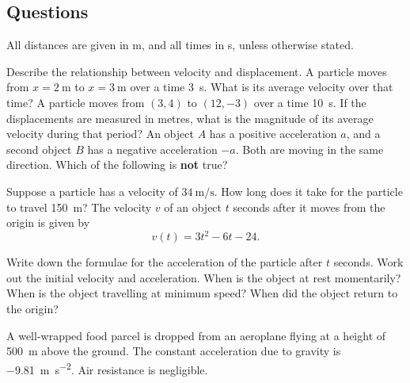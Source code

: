 \subsection*{Questions}
All distances are given in \si{\metre}, and all times in \si{\second}, unless otherwise stated.
\begin{questions}
  \questioA Describe the relationship between velocity and displacement.
  \questioA A particle moves from $ x = \SI{2}{\metre} $ to $ x = \SI{3}{\metre} $ over a time \SI{3}{\second}. What is its average velocity over that time?
  \questioA A particle moves from $ (3,4) $ to $ (12,-3) $ over a time \SI{10}{\second}. If the displacements are measured in metres, what is the magnitude of
            its average velocity during that period?
  \questioA An object $ A $ has a positive acceleration $ a $, and a second object $ B $ has a negative acceleration $ -a $. Both are moving in the
            same direction. Which of the following is \textbf{not} true?
  \questioA Suppose a particle has a velocity of $ \SI{34}{\metre\per\second} $. How long does it take for the particle to travel \SI{150}{\metre}?
  \question The velocity $ v $ of an object $ t $ seconds after it moves from the origin is given by
            \begin{displaymath}
              v(t) = 3t^2 - 6t - 24.
            \end{displaymath}
    \begin{parts}
      \parA Write down the formulae for the acceleration of the particle after $ t $ seconds.
      \parA Work out the initial velocity and acceleration.
      \parA When is the object at rest momentarily?
      \parM When is the object travelling at minimum speed?
      \parM When did the object return to the origin?
    \end{parts}
  \questioA A well-wrapped food parcel is dropped from an aeroplane flying at a height of \SI{500}{\metre}
            above the ground. The constant acceleration due to gravity is \SI{-9.81}{\metre\per\second\squared}. Air resistance
            is negligible.
    \begin{parts}

\end{parts}
\end{questions}
